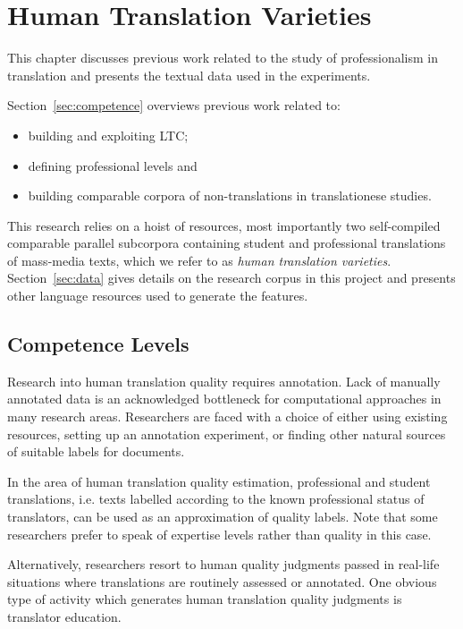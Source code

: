 \chapter{\label{cha:varieties}Human Translation Varieties}
This chapter discusses previous work related to the study of professionalism in translation and presents the textual data used in the experiments.  

Section~\ref{sec:competence} overviews previous work related to:
\begin{itemize}\compresslist{}
	\item building and exploiting \gls{LTC};
	\item defining professional levels and
	\item building comparable corpora of non-translations in translationese studies.
\end{itemize}

This research relies on a hoist of resources, most importantly two self-compiled comparable parallel subcorpora containing student and professional translations of mass-media texts, which we refer to as \textit{human translation varieties}. 
Section~\ref{sec:data} gives details on the research corpus in this project and presents other language resources used to generate the features.

\section{\label{sec:competence}Competence Levels}

Research into human translation quality requires annotation. Lack of manually annotated data is an acknowledged bottleneck for computational approaches in many research areas. Researchers are faced with a choice of either using existing resources, setting up an annotation experiment, or finding other natural sources of suitable labels for documents. 

In the area of human translation quality estimation, professional and student translations, i.e. texts labelled according to the known professional status of translators, can be used as an approximation of quality labels. Note that some researchers prefer to speak of expertise levels rather than quality in this case. 

Alternatively, researchers resort to human quality judgments passed in real-life situations where translations are routinely assessed or annotated. One obvious type of activity which generates human translation quality judgments is translator education. 

